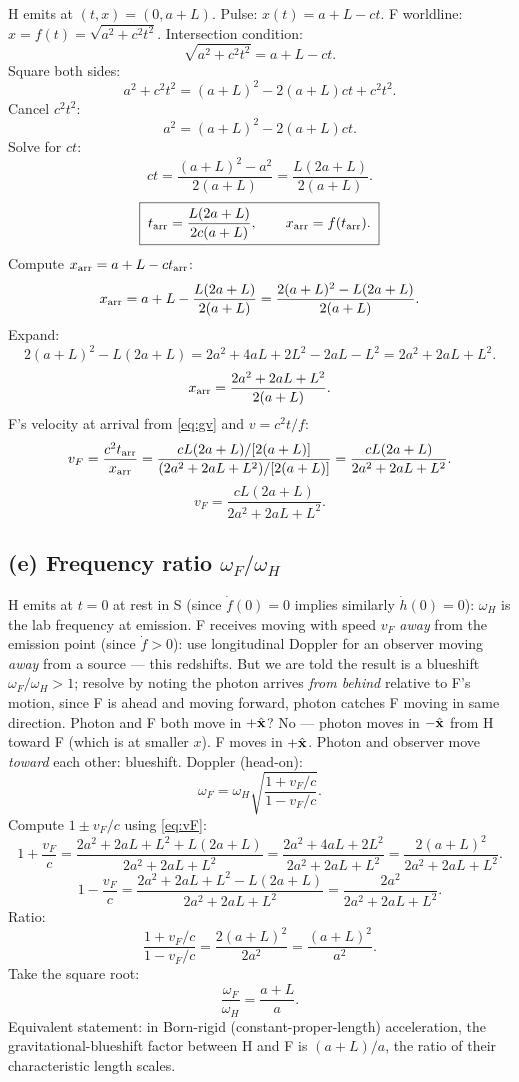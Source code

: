 \documentclass[11pt]{article}
\begin{document}
H emits at $(t,x)=(0,a+L)$. Pulse: $x(t)=a+L-ct$.
F worldline: $x=f(t)=\sqrt{a^2+c^2 t^2}$.
Intersection condition:
\[ \sqrt{a^2+c^2 t^2} = a+L - ct. \]
Square both sides:
\[ a^2 + c^2 t^2 = (a+L)^2 - 2(a+L)ct + c^2 t^2. \]
Cancel $c^2 t^2$:
\[ a^2 = (a+L)^2 - 2(a+L)ct. \]
Solve for $ct$:
\[ ct = \frac{(a+L)^2 - a^2}{2(a+L)} = \frac{L(2a+L)}{2(a+L)}. \]
\begin{equation}
\boxed{\;t_{\rm arr} = \frac{L(2a+L)}{2c(a+L)},\qquad x_{\rm arr} = f(t_{\rm arr}).\;}
\label{eq:arrival}
\end{equation}
Compute $x_{\rm arr}=a+L-ct_{\rm arr}$:
\[ x_{\rm arr} = a+L - \frac{L(2a+L)}{2(a+L)} = \frac{2(a+L)^2 - L(2a+L)}{2(a+L)}. \]
Expand:
\[ 2(a+L)^2 - L(2a+L) = 2a^2 + 4aL + 2L^2 - 2aL - L^2 = 2a^2 + 2aL + L^2. \]
\[ x_{\rm arr} = \frac{2a^2+2aL+L^2}{2(a+L)}. \]
F's velocity at arrival from \eqref{eq:gv} and $v=c^2 t/f$:
\[ v_F = \frac{c^2 t_{\rm arr}}{x_{\rm arr}} = \frac{cL(2a+L)/[2(a+L)]}{(2a^2+2aL+L^2)/[2(a+L)]} = \frac{cL(2a+L)}{2a^2+2aL+L^2}. \]
\begin{equation}
\boxed{\;v_F = \frac{cL(2a+L)}{2a^2+2aL+L^2}.\;}
\label{eq:vF}
\end{equation}

\subsection*{(e) Frequency ratio $\omega_F/\omega_H$}

H emits at $t=0$ at rest in S (since $\dot f(0)=0$ implies similarly $\dot h(0)=0$): $\omega_H$ is the lab frequency at emission.
F receives moving with speed $v_F$ \emph{away} from the emission point (since $\dot f>0$): use longitudinal Doppler for an observer moving \emph{away} from a source — this redshifts. But we are told the result is a blueshift $\omega_F/\omega_H>1$; resolve by noting the photon arrives \emph{from behind} relative to F's motion, since F is ahead and moving forward, photon catches F moving in same direction. Photon and F both move in $+\hat{\vb x}$? No — photon moves in $-\hat{\vb x}$ from H toward F (which is at smaller $x$). F moves in $+\hat{\vb x}$. Photon and observer move \emph{toward} each other: blueshift.
Doppler (head-on):
\[ \omega_F = \omega_H\sqrt{\frac{1+v_F/c}{1-v_F/c}}. \]
Compute $1\pm v_F/c$ using \eqref{eq:vF}:
\[ 1+\frac{v_F}{c} = \frac{2a^2+2aL+L^2 + L(2a+L)}{2a^2+2aL+L^2} = \frac{2a^2+4aL+2L^2}{2a^2+2aL+L^2} = \frac{2(a+L)^2}{2a^2+2aL+L^2}. \]
\[ 1-\frac{v_F}{c} = \frac{2a^2+2aL+L^2 - L(2a+L)}{2a^2+2aL+L^2} = \frac{2a^2}{2a^2+2aL+L^2}. \]
Ratio:
\[ \frac{1+v_F/c}{1-v_F/c} = \frac{2(a+L)^2}{2a^2} = \frac{(a+L)^2}{a^2}. \]
Take the square root:
\begin{equation}
\boxed{\;\frac{\omega_F}{\omega_H} = \frac{a+L}{a}.\;}
\label{eq:doppler}
\end{equation}
Equivalent statement: in Born-rigid (constant-proper-length) acceleration, the gravitational-blueshift factor between H and F is $(a+L)/a$, the ratio of their characteristic length scales.
\end{document}
